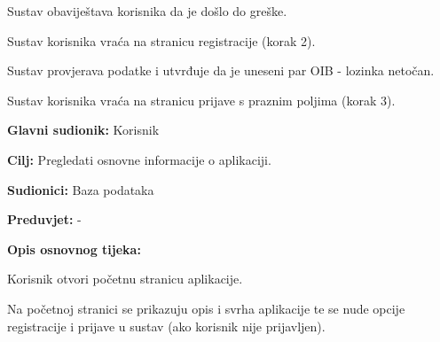 \begin{packed_item}
\begin{packed_item}
\begin{packed_enum}
								\item Sustav obaviještava korisnika da je došlo do greške.
								\item Sustav korisnika vraća na stranicu registracije (korak 2).
							\end{packed_enum}
							
							\item[5.a] Sustav provjerava podatke i utvrđuje da je uneseni par OIB - lozinka netočan.
							\item[] \begin{packed_enum}
								
								\item Sustav korisnika vraća na stranicu prijave s praznim poljima (korak 3).
								
								
							\end{packed_enum}
							
						\end{packed_item}
					\end{packed_item}
					
					\noindent {}
					\begin{packed_item}
						
						\item \textbf{Glavni sudionik: }Korisnik
						\item  \textbf{Cilj:} Pregledati osnovne informacije o aplikaciji.
						\item  \textbf{Sudionici:} Baza podataka
						\item  \textbf{Preduvjet:} -
						\item  \textbf{Opis osnovnog tijeka:}
						
						\item[] \begin{packed_enum}
							
							\item Korisnik otvori početnu stranicu aplikacije.
							\item Na početnoj stranici se prikazuju opis i svrha aplikacije te se nude opcije registracije i prijave u sustav (ako korisnik nije prijavljen).
						\end{packed_enum}
						
					
					\end{packed_item}
					
